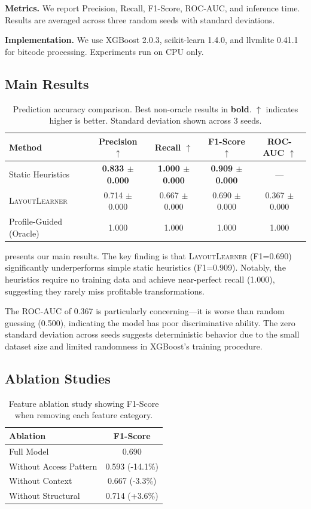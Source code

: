 \documentclass{article}
\begin{document}
\textbf{Metrics.} We report Precision, Recall, F1-Score, ROC-AUC, and inference time. Results are averaged across three random seeds with standard deviations.

\textbf{Implementation.} We use XGBoost 2.0.3, scikit-learn 1.4.0, and llvmlite 0.41.1 for bitcode processing. Experiments run on CPU only.

\subsection{Main Results}

\begin{table}[t]
\caption{Prediction accuracy comparison. Best non-oracle results in \textbf{bold}. $\uparrow$ indicates higher is better. Standard deviation shown across 3 seeds.}
\label{tab:main}
\centering
\begin{tabular}{lcccc}
\toprule
Method & Precision $\uparrow$ & Recall $\uparrow$ & F1-Score $\uparrow$ & ROC-AUC $\uparrow$ \\
\midrule
Static Heuristics & \textbf{0.833 $\pm$ 0.000} & \textbf{1.000 $\pm$ 0.000} & \textbf{0.909 $\pm$ 0.000} & --- \\
\textsc{LayoutLearner} & 0.714 $\pm$ 0.000 & 0.667 $\pm$ 0.000 & 0.690 $\pm$ 0.000 & 0.367 $\pm$ 0.000 \\
Profile-Guided (Oracle) & 1.000 & 1.000 & 1.000 & 1.000 \\
\bottomrule
\end{tabular}
\end{table}

 presents our main results. The key finding is that \textsc{LayoutLearner} (F1=0.690) significantly underperforms simple static heuristics (F1=0.909). Notably, the heuristics require no training data and achieve near-perfect recall (1.000), suggesting they rarely miss profitable transformations.

The ROC-AUC of 0.367 is particularly concerning---it is worse than random guessing (0.500), indicating the model has poor discriminative ability. The zero standard deviation across seeds suggests deterministic behavior due to the small dataset size and limited randomness in XGBoost's training procedure.

\subsection{Ablation Studies}

\begin{table}[t]
\caption{Feature ablation study showing F1-Score when removing each feature category.}
\label{tab:ablation}
\centering
\begin{tabular}{lc}
\toprule
Ablation & F1-Score \\
\midrule
Full Model & 0.690 \\
Without Access Pattern & 0.593 (-14.1\%) \\
Without Context & 0.667 (-3.3\%) \\
Without Structural & 0.714 (+3.6\%) \\
\bottomrule
\end{tabular}
\end{table}
\end{document}
